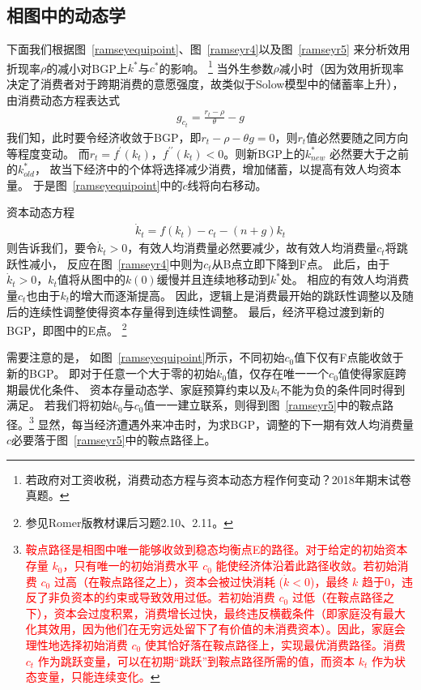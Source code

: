 \documentclass[cn,normal,11pt,black]{elegantnote}
\begin{document}
\subsection{相图中的动态学}
 
下面我们根据图~\ref{ramseyequipoint}、图~\ref{ramseyr4}以及图~\ref{ramseyr5}
来分析效用折现率$\rho$的减小对BGP上$k^*$与$c^*$的影响。
\footnote{若政府对工资收税，消费动态方程与资本动态方程作何变动？2018年期末试卷真题。}
当外生参数$\rho$减小时（因为效用折现率决定了消费者对于跨期消费的意愿强度，故类似于Solow模型中的储蓄率上升），
由消费动态方程表达式
\begin{align*}
    g_{c_t} = \frac{r_t - \rho}{\theta} - g
\end{align*}
我们知，此时要令经济收敛于BGP，即$r_t - \rho - \theta g = 0$，则$r_t$值必然要随之同方向等程度变动。
而$r_t = f^\prime(k_t)$，$f^{\prime \prime}(k_t) <0$。则新BGP上的$k^*_{new}$ 必然要大于之前的$k^*_{old}$，
故当下经济中的个体将选择减少消费，增加储蓄，以提高有效人均资本量。
于是图~\ref{ramseyequipoint}中的$\dot{c}$线将向右移动。

资本动态方程
\begin{align*}
    \dot{k}_t = f(k_t) - c_t - (n+g)k_t
\end{align*}
则告诉我们，要令$\dot{k}_t > 0$，有效人均消费量必然要减少，故有效人均消费量$c_t$将跳跃性减小，
反应在图~\ref{ramseyr4}中则为$c_t$从B点立即下降到F点。
此后，由于$\dot{k}_t > 0$，$k_t$值将从图中的$k(0)$缓慢并且连续地移动到$k^*$处。
相应的有效人均消费量$c_t$也由于$k_t$的增大而逐渐提高。
因此，逻辑上是消费最开始的跳跃性调整以及随后的连续性调整使得资本存量得到连续性调整。
最后，经济平稳过渡到新的BGP，即图中的E点。
\footnote{参见Romer版教材课后习题2.10、2.11。}

需要注意的是，
如图~\ref{ramseyequipoint}所示，不同初始$c_0$值下仅有F点能收敛于新的BGP。
即对于任意一个大于零的初始$k_0$值，仅存在唯一一个$c_0$值使得家庭跨期最优化条件、
资本存量动态学、家庭预算约束以及$k_t$不能为负的条件同时得到满足。
    若我们将初始$k_0$与$c_0$值一一建立联系，则得到图~\ref{ramseyr5}中的鞍点路径。\footnote{\textcolor{red}{鞍点路径是相图中唯一能够收敛到稳态均衡点E的路径。对于给定的初始资本存量 $k_0$，只有唯一的初始消费水平 $c_0$ 能使经济体沿着此路径收敛。若初始消费 $c_0$ 过高（在鞍点路径之上），资本会被过快消耗 ($\dot{k}<0$)，最终 $k$ 趋于0，违反了非负资本的约束或导致效用过低。若初始消费 $c_0$ 过低（在鞍点路径之下），资本会过度积累，消费增长过快，最终违反横截条件（即家庭没有最大化其效用，因为他们在无穷远处留下了有价值的未消费资本）。因此，家庭会理性地选择初始消费 $c_0$ 使其恰好落在鞍点路径上，实现最优消费路径。消费 $c_t$ 作为跳跃变量，可以在初期“跳跃”到鞍点路径所需的值，而资本 $k_t$ 作为状态变量，只能连续变化。}}
显然，每当经济遭遇外来冲击时，为求BGP，调整的下一期有效人均消费量$c$必要落于图~\ref{ramseyr5}中的鞍点路径上。
\end{document}
